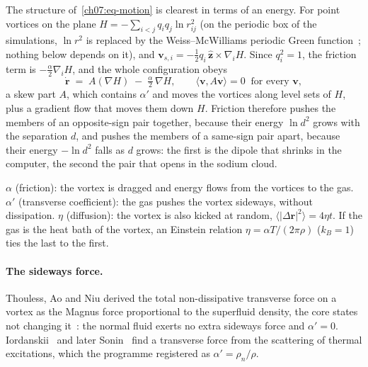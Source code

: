 The structure of~\eqref{ch07:eq-motion} is clearest in terms of an energy. For point vortices on the plane $H=-\sum_{i<j}q_iq_j\ln r_{ij}^2$ (on the periodic box of the simulations, $\ln r^2$ is
replaced by the Weiss--McWilliams periodic Green function~\cite{WeissMcWilliams1991}; nothing below depends on it), and $\mathbf v_{s,i}=-\tfrac12 q_i\,\hat{\mathbf z}\times\nabla_iH$. Since $q_i^2=1$,
the friction term is $-\tfrac{\alpha}{2}\nabla_iH$, and the whole configuration obeys
\begin{equation}
  \dot{\mathbf r}\;=\;A(\nabla H)\;-\;\tfrac{\alpha}{2}\,\nabla H,
  \qquad \langle \mathbf v,A\mathbf v\rangle=0\ \text{ for every }\mathbf v,
  \label{ch07:eq-flow}
\end{equation}
a skew part $A$, which contains $\alpha'$ and moves the vortices along level sets of $H$, plus a gradient flow that moves them down $H$. Friction therefore pushes the members of an
opposite-sign pair together, because their energy $\ln d^2$ grows with the separation $d$, and pushes the members of a same-sign pair apart, because their energy $-\ln d^2$ falls as $d$ grows: the
first is the dipole that shrinks in the computer, the second the pair that opens in the sodium cloud.

\begin{keybox}
\textbf{$\alpha$} (friction): the vortex is dragged and energy flows from the vortices to the gas. \textbf{$\alpha'$} (transverse coefficient): the gas pushes the vortex sideways, without dissipation.
\textbf{$\eta$} (diffusion): the vortex is also kicked at random, $\langle|\Delta\mathbf r|^2\rangle=4\eta t$. If the gas is the heat bath of the vortex, an Einstein relation
$\eta=\alpha T/(2\pi\rho)$ ($k_B=1$) ties the last to the first.
\end{keybox}

\paragraph{The sideways force.} Thouless, Ao and Niu derived the total non-dissipative transverse force on a vortex as the Magnus force proportional to the superfluid density, the core states not changing
it~\cite{ThoulessAoNiu1996}: the normal fluid exerts no extra sideways force and $\alpha'=0$. Iordanskii~\cite{Iordanskii1964} and later Sonin~\cite{Sonin1997} find a transverse force from
the scattering of thermal excitations, which the programme registered as $\alpha'=\rho_n/\rho$.

